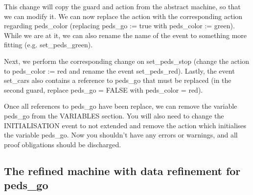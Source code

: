 This change will copy the guard and action from the abstract machine, so that we can modify it.  We can now replace the action with the corresponding action regarding \textsf{peds\_color} (replacing \textsf{peds\_go := true} with \textsf{peds\_color := green}).  While we are at it, we can also rename the name of the event to something more fitting (e.g. \textsf{set\_peds\_green}).

Next, we perform the corresponding change on \textsf{set\_peds\_stop} (change the action to \textsf{peds\_color := red} and rename the event \textsf{set\_peds\_red}). Lastly, the event \textsf{set\_cars} also contains a reference to \textsf{peds\_go} that must be replaced (in the second guard, replace \textsf{peds\_go = FALSE} with \textsf{peds\_color = red}).

Once all references to \textsf{peds\_go} have been replace, we can remove the variable \textsf{peds\_go} from the \textsf{VARIABLES} section. You will also need to change the \textsf{INITIALISATION} event to not extended and remove the action which initialises the variable \textsf{peds\_go}. Now you shouldn't have any errors or warnings, and all proof obligations should be discharged.


\subsection{The refined machine with data refinement for peds\_go}

